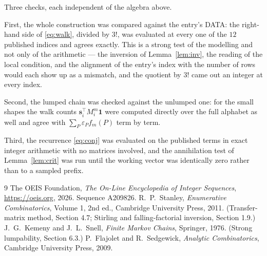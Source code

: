 \documentclass[11pt,a4paper]{article}
\theoremstyle{plain}
\theoremstyle{definition}
\begin{document}
Three checks, each independent of the algebra above.

First, the whole construction was compared against the entry's DATA: the right-hand side of
\eqref{eq:walk}, divided by $3!$, was evaluated at every one of the $12$
published indices and agrees exactly. This is a strong test of the modelling and not only of
the arithmetic --- the inversion of Lemma~\ref{lem:inv}, the reading of the local
condition, and the alignment of the entry's index with the number of rows would each
show up as a mismatch, and the quotient by $3!$ came out an integer at every index.

Second, the lumped chain was checked against the unlumped one: for the small shapes the walk
counts $\mathbf{s}_i^{\!\top}M_i^{m}\mathbf{1}$ were computed directly over the full
alphabet as well and agree with $\sum_P\varepsilon_Pf_m(P)$ term by term.

Third, the recurrence \eqref{eq:conj} was evaluated on the published terms in exact integer
arithmetic with no matrices involved, and the annihilation test of Lemma~\ref{lem:crit} was
run until the working vector was identically zero rather than to a sampled prefix.

\begin{thebibliography}{9}
 The OEIS Foundation, \emph{The On-Line Encyclopedia of Integer
Sequences}, \url{https://oeis.org}, 2026. Sequence A209826.
 R.~P.~Stanley, \emph{Enumerative Combinatorics}, Volume 1, 2nd ed.,
Cambridge University Press, 2011. (Transfer-matrix method, Section 4.7; Stirling and
falling-factorial inversion, Section 1.9.)
 J.~G.~Kemeny and J.~L.~Snell, \emph{Finite Markov Chains}, Springer,
1976. (Strong lumpability, Section 6.3.)
 P.~Flajolet and R.~Sedgewick, \emph{Analytic Combinatorics}, Cambridge
University Press, 2009.
\end{thebibliography}
\end{document}
